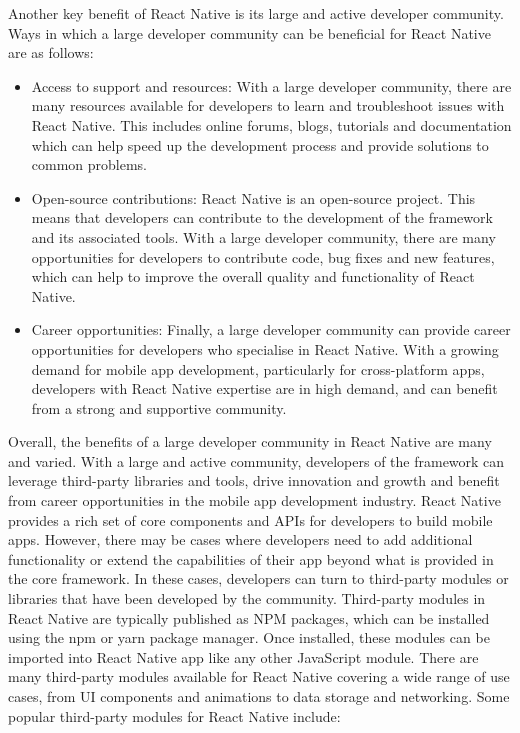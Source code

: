Another key benefit of React Native is its large and active developer community. Ways in which a large developer community can be beneficial for React Native are as follows: 
\begin{itemize}
    \item Access to support and resources: With a large developer community, there are many resources available for developers to learn and troubleshoot issues with React Native. This includes online forums, blogs, tutorials and documentation which can help speed up the development process and provide solutions to common problems.
    \item Open-source contributions: React Native is an open-source project. This means that developers  can contribute to the development of the framework and its associated tools. With a large developer community, there are many opportunities for developers to contribute code, bug fixes and new features, which can help to improve the overall quality and functionality of React Native.
    \item Career opportunities: Finally, a large developer community can provide career opportunities for developers who specialise in React Native. With a growing demand for mobile app development, particularly for cross-platform apps, developers with React Native expertise are in high demand, and can benefit from a strong and supportive community.
\end{itemize}
Overall, the benefits of a large developer community in React Native are many and varied. With a large and active community, developers of the framework can leverage third-party libraries and tools, drive innovation and growth and benefit from career opportunities in the mobile app development industry.
\newline \newline
React Native provides a rich set of core components and APIs for developers to build mobile apps. However, there may be cases where developers need to add additional functionality or extend the capabilities of their app beyond what is provided in the core framework. In these cases, developers can turn to third-party modules or libraries that have been developed by the community. Third-party modules in React Native are typically published as NPM packages, which can be installed using the npm or yarn package manager. Once installed, these modules can be imported into React Native app like any other JavaScript module. There are many third-party modules available for React Native covering a wide range of use cases, from UI components and animations to data storage and networking. Some popular third-party modules for React Native include:
